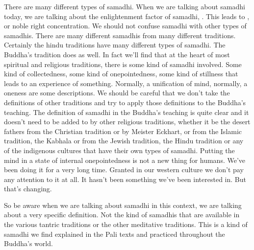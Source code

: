 \documentclass[letterpaper,10pt,english]{sphinxmanual}
\begin{document}
\sphinxAtStartPar
There are many different types of samadhi. When we are talking about
samadhi  today,  we  are  talking  about  the  enlightenment  factor  of  samadhi,
. This leads to
, or noble right concentration. We  should  not  confuse  samadhi  with  other  types  of  samadhis. There
are  many  different  samadhis  from  many  different  traditions.  Certainly  the
hindu traditions have many different types of samadhi. The Buddha’s tradition does as well. In fact we’ll find that at the heart of most spiritual and religious traditions, there is some kind of samadhi involved. Some kind of collectedness, some kind of one\sphinxhyphen{}pointedness, some kind of stillness that leads
to an experience of something. Normally, a unification of mind, normally, a
oneness are some descriptions. We should be careful that we don’t take the
definitions of other traditions and try to apply those definitions to the Buddha’s teaching. The definition of samadhi in the Buddha’s teaching is quite
clear and it doesn’t need to be added to by other religious traditions, whether
it be the desert fathers from the Christian tradition or by Meister Eckhart,
or from the Islamic tradition, the Kabhala or from the Jewish tradition, the
Hindu tradition or any of the indigenous cultures that have their own types
of samadhi. Putting the mind in a state of internal one\sphinxhyphen{}pointedness is not a
new thing for humans. We’ve been doing it for a very long time. Granted
in our western culture we don’t pay any attention to it at all. It hasn’t been
something we’ve been interested in. But that’s changing.

\sphinxAtStartPar
So be aware when we are talking about samadhi in this context, we are
talking  about  a  very  specific  definition.  Not  the  kind  of  samadhis  that  are
available in the various tantric traditions or the other meditative traditions.
  This is a kind of samadhi we find explained in the Pali texts and practiced
throughout the Buddha’s world.
\end{document}
